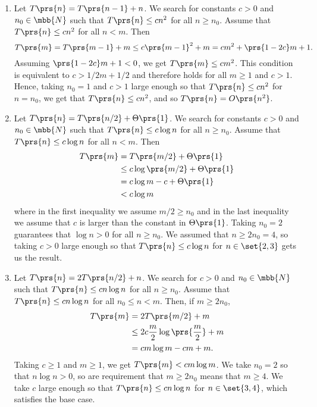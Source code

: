 \documentclass[oneside]{scrbook}
\theoremstyle{definition}
\begin{document}
\begin{exercise} \label{exercise:substitution-method}
    \begin{enumerate}[label=\alph*.]
        \item %

        Let $T\prs{n} = T\prs{n-1} + n$.
        We search for constants $c>0$ and $n_0 \in \mbb{N}$ such that $T\prs{n} \leq c n^2$ for all $n \geq n_0$.
        Assume that $T\prs{n} \leq c n^2$ for all $n < m$. Then
        \[T\prs{m} = T\prs{m-1} + m \leq c \prs{m-1}^2 + m = c m^2 + \prs{1 - 2c} m + 1 \text{.}\]
        Assuming $\prs{1 - 2c} m + 1 < 0$, we get $T\prs{m} \leq c m^2$. This condition is equivalent to
        $c > 1/2m + 1/2$ and therefore holds for all $m \geq 1$ and $c > 1$.
        Hence, taking $n_0 = 1$ and $c > 1$ large enough so that $T\prs{n} \leq c n^2$ for $n = n_0$, we get that $T\prs{n} \leq c n^2$, and so $T\prs{n} = O\prs{n^2}$. 
        
        \item %

        Let $T\prs{n} = T\prs{n/2} + \Theta\prs{1}$.
        We search for constants $c>0$ and $n_0 \in \mbb{N}$ such that $T\prs{n} \leq c \log n$ for all $n \geq n_0$.
        Assume that $T\prs{n} \leq c \log n$ for all $n < m$. Then
        \begin{align*}
            T\prs{m} &= T\prs{m/2} + \Theta\prs{1} \\&\leq
            c \log\prs{m/2} + \Theta\prs{1} \\&=
            c \log m - c + \Theta\prs{1} \\&<
            c \log m
        \end{align*}
        where in the first inequality we assume $m/2 \geq n_0$ and in the last inequality we assume that $c$ is larger than the constant in $\Theta\prs{1}$. Taking $n_0 = 2$ guarantees that $\log n > 0$ for all $n \geq n_0$. We assumed that $n \geq 2 n_0 = 4$, so taking $c > 0$ large enough so that $T\prs{n} \leq c \log n$ for $n \in \set{2,3}$ gets us the result.
        
        \item %

        Let $T\prs{n} = 2 T\prs{n/2} + n$.
        We search for $c > 0$ and $n_0 \in \mbb{N}$ such that $T\prs{n} \leq c n \log n$ for all $n \geq n_0$.
        Assume that $T\prs{n} \leq c n\log n$ for all $n_0 \leq n < m$. Then, if $m \geq 2 n_0$,
        \begin{align*}
            T\prs{m} &= 2 T\prs{m/2} + m
            \\&\leq 2 c \frac{m}{2} \log\prs{\frac{m}{2}} + m
            \\&= cm \log m - cm + m \text{.}
        \end{align*}
        Taking $c \geq 1$ and $m \geq 1$, we get $T\prs{m} < cm \log m$. We take $n_0 = 2$ so that $n \log n > 0$, so are requirement that $m \geq 2 n_0$ means that $m \geq 4$. We take $c$ large enough so that $T\prs{n} \leq c n \log n$ for $n \in \set{3,4}$, which satisfies the base case.
        

\end{enumerate}
\end{exercise}
\end{document}
